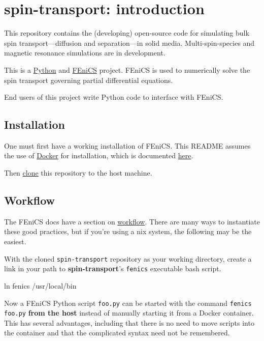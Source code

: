 \documentclass[%
oneside,                 %
final,                   %
10pt]{article}
\begin{document}

\section{spin-transport: introduction}

This repository contains the (developing) open-source code for simulating bulk spin transport---diffusion and separation---in solid media. Multi-spin-species and magnetic resonance simulations are in development.

This is a \href{{https://www.python.org/}}{Python} and \href{{https://fenicsproject.org/}}{FEniCS} project. FEniCS is used to numerically solve the spin transport governing partial differential equations.

End users of this project write Python code to interface with FEniCS.

\subsection{Installation}

One must first have a working installation of FEniCS.
This README assumes the use of \href{{https://www.docker.com/}}{Docker} for installation, which is documented \href{{http://fenics.readthedocs.io/projects/containers/en/latest/}}{here}.

Then \href{{https://help.github.com/articles/cloning-a-repository/}}{clone} this repository to the host machine.

\subsection{Workflow}

The FEniCS docs have a section on \href{{http://fenics.readthedocs.io/projects/containers/en/latest/work_flows.html}}{workflow}.
There are many ways to instantiate these good practices, but if you're using a \*nix system, the following may be the easiest.

With the cloned \texttt{spin-transport} repository as your working directory, create a link in your path to \textbf{spin-transport}'s \texttt{fenics} executable bash script.

\bshcod
ln fenics /usr/local/bin
\eshcod

Now a FEniCS Python script \texttt{foo.py} can be started with the command \texttt{fenics foo.py} \textbf{from the host} instead of manually starting it from a Docker container.
This has several advantages, including that there is no need to move scripts into the container and that the complicated syntax need not be remembered.
\end{document}

